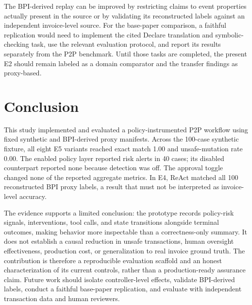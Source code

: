 \documentclass[conference]{IEEEtran}
\begin{document}
The BPI-derived replay can be improved by restricting claims to event properties actually present in the source or by validating its reconstructed labels against an independent invoice-level source. For the base-paper comparison, a faithful replication would need to implement the cited Declare translation and symbolic-checking task, use the relevant evaluation protocol, and report its results separately from the P2P benchmark. Until those tasks are completed, the present E2 should remain labeled as a domain comparator and the transfer findings as proxy-based.

\section{Conclusion}

This study implemented and evaluated a policy-instrumented P2P workflow using fixed synthetic and BPI-derived proxy manifests. Across the 100-case synthetic fixture, all eight E5 variants reached exact match 1.00 and unsafe-mutation rate 0.00. The enabled policy layer reported risk alerts in 40 cases; its disabled counterpart reported none because detection was off. The approval toggle changed none of the reported aggregate metrics. In E4, ReAct matched all 100 reconstructed BPI proxy labels, a result that must not be interpreted as invoice-level accuracy.

The evidence supports a limited conclusion: the prototype records policy-risk signals, interventions, tool calls, and state transitions alongside terminal outcomes, making behavior more inspectable than a correctness-only summary. It does not establish a causal reduction in unsafe transactions, human oversight effectiveness, production cost, or generalization to real invoice ground truth. The contribution is therefore a reproducible evaluation scaffold and an honest characterization of its current controls, rather than a production-ready assurance claim. Future work should isolate controller-level effects, validate BPI-derived labels, conduct a faithful base-paper replication, and evaluate with independent transaction data and human reviewers.



\end{document}
